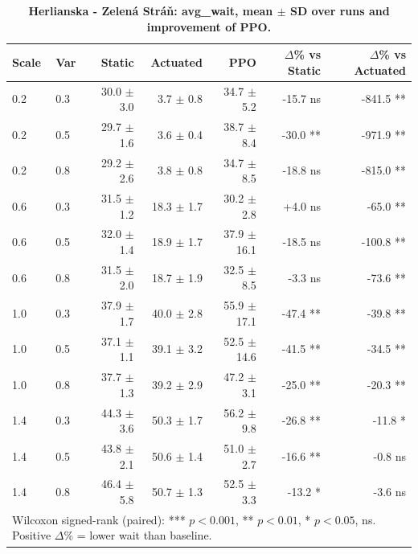 \begin{table}
\caption{\textbf{Herlianska - Zelená Stráň: avg\_wait, mean $\pm$ SD over runs and improvement of PPO.}}
\label{tab:stats_Herlianska_-_Zelená_Stráň_avg_wait}
\centering
\begin{tabular}{llrrrrr}
\hline
Scale & Var & Static & Actuated & PPO & $\Delta$\% vs Static & $\Delta$\% vs Actuated \\
\hline
0.2 & 0.3 & 30.0 $\pm$ 3.0 & 3.7 $\pm$ 0.8 & 34.7 $\pm$ 5.2 & -15.7 ns & -841.5 ** \\
0.2 & 0.5 & 29.7 $\pm$ 1.6 & 3.6 $\pm$ 0.4 & 38.7 $\pm$ 8.4 & -30.0 ** & -971.9 ** \\
0.2 & 0.8 & 29.2 $\pm$ 2.6 & 3.8 $\pm$ 0.8 & 34.7 $\pm$ 8.5 & -18.8 ns & -815.0 ** \\
0.6 & 0.3 & 31.5 $\pm$ 1.2 & 18.3 $\pm$ 1.7 & 30.2 $\pm$ 2.8 & +4.0 ns & -65.0 ** \\
0.6 & 0.5 & 32.0 $\pm$ 1.4 & 18.9 $\pm$ 1.7 & 37.9 $\pm$ 16.1 & -18.5 ns & -100.8 ** \\
0.6 & 0.8 & 31.5 $\pm$ 2.0 & 18.7 $\pm$ 1.9 & 32.5 $\pm$ 8.5 & -3.3 ns & -73.6 ** \\
1.0 & 0.3 & 37.9 $\pm$ 1.7 & 40.0 $\pm$ 2.8 & 55.9 $\pm$ 17.1 & -47.4 ** & -39.8 ** \\
1.0 & 0.5 & 37.1 $\pm$ 1.1 & 39.1 $\pm$ 3.2 & 52.5 $\pm$ 14.6 & -41.5 ** & -34.5 ** \\
1.0 & 0.8 & 37.7 $\pm$ 1.3 & 39.2 $\pm$ 2.9 & 47.2 $\pm$ 3.1 & -25.0 ** & -20.3 ** \\
1.4 & 0.3 & 44.3 $\pm$ 3.6 & 50.3 $\pm$ 1.7 & 56.2 $\pm$ 9.8 & -26.8 ** & -11.8 * \\
1.4 & 0.5 & 43.8 $\pm$ 2.1 & 50.6 $\pm$ 1.4 & 51.0 $\pm$ 2.7 & -16.6 ** & -0.8 ns \\
1.4 & 0.8 & 46.4 $\pm$ 5.8 & 50.7 $\pm$ 1.3 & 52.5 $\pm$ 3.3 & -13.2 * & -3.6 ns \\
\hline
\multicolumn{7}{l}{\footnotesize Wilcoxon signed-rank (paired): *** $p<0.001$, ** $p<0.01$, * $p<0.05$, ns. Positive $\Delta$\% = lower wait than baseline.} \\
\end{tabular}
\end{table}
